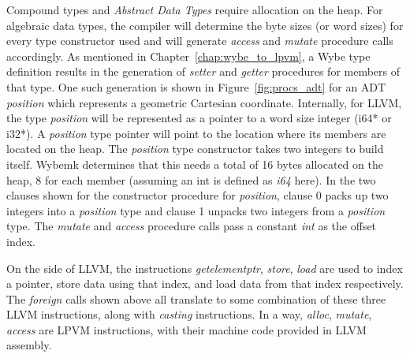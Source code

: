 Compound types and \textit{Abstract Data Types} require allocation on the heap.
For algebraic data types, the compiler will determine the byte sizes (or word
sizes) for every type constructor used and will generate \textit{access} and
\textit{mutate} procedure calls accordingly. As mentioned in
Chapter~\ref{chap:wybe_to_lpvm}, a Wybe type definition results in the
generation of \textit{setter} and \textit{getter} procedures for members of
that type. One such generation is shown in Figure~\ref{fig:procs_adt} for an
ADT \textit{position} which represents a geometric Cartesian
coordinate. Internally, for LLVM, the type \textit{position} will be
represented as a pointer to a word size integer (i64* or i32*). A
\textit{position} type pointer will point to the location where its members are
located on the heap. The \textit{position} type constructor takes two integers
to build itself. Wybemk determines that this needs a total of 16 bytes
allocated on the heap, 8 for each member (assuming an int is defined as
\textit{i64} here). In the two clauses shown for the constructor procedure for
\textit{position}, clause 0 packs up two integers into a \textit{position} type
and clause 1 unpacks two integers from a \textit{position} type. The
\textit{mutate} and \textit{access} procedure calls pass a constant
\textit{int} as the offset index.

On the side of LLVM, the instructions \textit{getelementptr}, \textit{store},
\textit{load} are used to index a pointer, store data using that index, and
load data from that index respectively. The \textit{foreign} calls shown above
all translate to some combination of these three LLVM instructions, along with
\textit{casting} instructions. In a way, \textit{alloc}, \textit{mutate},
\textit{access} are LPVM instructions, with their machine code provided in LLVM
assembly. 



